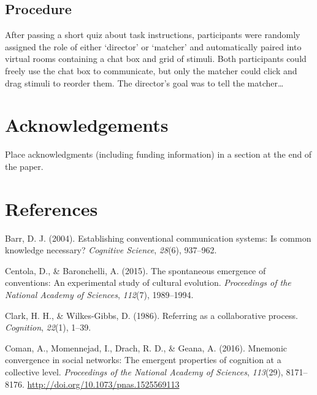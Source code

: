 \documentclass[10pt, letterpaper]{article}
\begin{document}
\subsection{Procedure}\label{procedure}

After passing a short quiz about task instructions, participants were
randomly assigned the role of either `director' or `matcher' and
automatically paired into virtual rooms containing a chat box and grid
of stimuli. Both participants could freely use the chat box to
communicate, but only the matcher could click and drag stimuli to
reorder them. The director's goal was to tell the matcher\dots

\section{Acknowledgements}\label{acknowledgements}

Place acknowledgments (including funding information) in a section at
the end of the paper.

\section{References}\label{references}

\setlength{\parindent}{-0.1in} \setlength{\leftskip}{0.125in} \noindent

\hypertarget{refs}{}
\hypertarget{ref-Barr2004_ConventionalCommunicationSystems}{}
Barr, D. J. (2004). Establishing conventional communication systems: Is
common knowledge necessary? \emph{Cognitive Science}, \emph{28}(6),
937--962.

\hypertarget{ref-CentolaBaronchelli15_ConventionEmergence}{}
Centola, D., \& Baronchelli, A. (2015). The spontaneous emergence of
conventions: An experimental study of cultural evolution.
\emph{Proceedings of the National Academy of Sciences}, \emph{112}(7),
1989--1994.

\hypertarget{ref-ClarkWilkesGibbs86_ReferringCollaborative}{}
Clark, H. H., \& Wilkes-Gibbs, D. (1986). Referring as a collaborative
process. \emph{Cognition}, \emph{22}(1), 1--39.

\hypertarget{ref-ComanEtAl16_MnemonicConvergence}{}
Coman, A., Momennejad, I., Drach, R. D., \& Geana, A. (2016). Mnemonic
convergence in social networks: The emergent properties of cognition at
a collective level. \emph{Proceedings of the National Academy of
Sciences}, \emph{113}(29), 8171--8176.
\url{http://doi.org/10.1073/pnas.1525569113}
\end{document}
